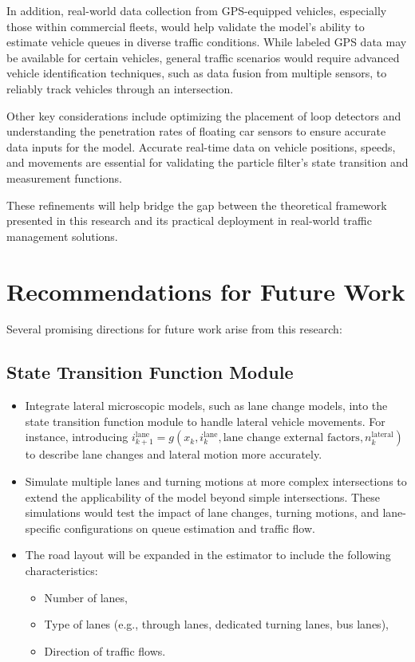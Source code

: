 In addition, real-world data collection from GPS-equipped vehicles, especially those within commercial fleets, would help validate the model's ability to estimate vehicle queues in diverse traffic conditions. While labeled GPS data may be available for certain vehicles, general traffic scenarios would require advanced vehicle identification techniques, such as data fusion from multiple sensors, to reliably track vehicles through an intersection.

Other key considerations include optimizing the placement of loop detectors and understanding the penetration rates of floating car sensors to ensure accurate data inputs for the model. Accurate real-time data on vehicle positions, speeds, and movements are essential for validating the particle filter’s state transition and measurement functions.

These refinements will help bridge the gap between the theoretical framework presented in this research and its practical deployment in real-world traffic management solutions.



\section{Recommendations for Future Work}

Several promising directions for future work arise from this research:

\subsection{State Transition Function Module}
    \begin{itemize}
        \item Integrate lateral microscopic models, such as lane change models, into the state transition function module to handle lateral vehicle movements. For instance, introducing $i_{k+1}^\text{lane} = g(x_k, i_k^{\text{lane}}, \text{lane change external factors}, n_k^\text{lateral})$ to describe lane changes and lateral motion more accurately.
        \item Simulate multiple lanes and turning motions at more complex intersections to extend the applicability of the model beyond simple intersections. These simulations would test the impact of lane changes, turning motions, and lane-specific configurations on queue estimation and traffic flow.
        \item The road layout will be expanded in the estimator to include the following characteristics:
        \begin{itemize}
            \item Number of lanes,
            \item Type of lanes (e.g., through lanes, dedicated turning lanes, bus lanes),
            \item Direction of traffic flows.
        \end{itemize}
    \end{itemize}


